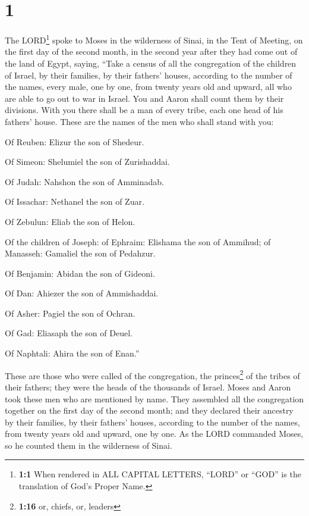 \hypertarget{section}{%
\section{1}\label{section}}

 The LORD\footnote{\textbf{1:1} When rendered in ALL
  CAPITAL LETTERS, ``LORD'' or ``GOD'' is the translation of God's
  Proper Name.} spoke to Moses in the wilderness of Sinai, in the Tent
of Meeting, on the first day of the second month, in the second year
after they had come out of the land of Egypt, saying, 
``Take a census of all the congregation of the children of Israel, by
their families, by their fathers' houses, according to the number of the
names, every male, one by one,  from twenty years old and
upward, all who are able to go out to war in Israel. You and Aaron shall
count them by their divisions.  With you there shall be a
man of every tribe, each one head of his fathers' house. 
These are the names of the men who shall stand with you:

Of Reuben: Elizur the son of Shedeur.

 Of Simeon: Shelumiel the son of Zurishaddai.

 Of Judah: Nahshon the son of Amminadab.

 Of Issachar: Nethanel the son of Zuar.

 Of Zebulun: Eliab the son of Helon.

 Of the children of Joseph: of Ephraim: Elishama the son
of Ammihud; of Manasseh: Gamaliel the son of Pedahzur.

 Of Benjamin: Abidan the son of Gideoni.

 Of Dan: Ahiezer the son of Ammishaddai.

 Of Asher: Pagiel the son of Ochran.

 Of Gad: Eliasaph the son of Deuel.

 Of Naphtali: Ahira the son of Enan.''

 These are those who were called of the congregation, the
princes\footnote{\textbf{1:16} or, chiefs, or, leaders} of the tribes of
their fathers; they were the heads of the thousands of Israel.
 Moses and Aaron took these men who are mentioned by
name.  They assembled all the congregation together on
the first day of the second month; and they declared their ancestry by
their families, by their fathers' houses, according to the number of the
names, from twenty years old and upward, one by one.  As
the LORD commanded Moses, so he counted them in the wilderness of Sinai.

